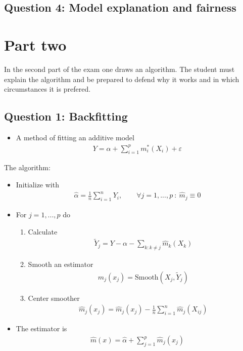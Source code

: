 \documentclass[a4paper,12pt,openany]{book}
\providecommand{\tightlist}{%
 \setlength{\itemsep}{0pt}\setlength{\parskip}{0pt}}
\begin{document}
\hypertarget{question-4-model-explanation-and-fairness}{%
\subsection{Question 4: Model explanation and fairness}\label{question-4-model-explanation-and-fairness}}

\hypertarget{part-two}{%
\section{Part two}\label{part-two}}

In the second part of the exam one draws an algorithm. The student must explain the algorithm and be prepared to defend why it works and in which circumstances it is prefered.

\hypertarget{question-1-backfitting}{%
\subsection{Question 1: Backfitting}\label{question-1-backfitting}}

\begin{itemize}
\tightlist
\item
  A method of fitting an additive model
  \begin{align*}
    Y=\alpha +\sum_{i=1}^pm^*_i(X_i)+\varepsilon
    \end{align*}
\end{itemize}

The algorithm:

\begin{itemize}
\tightlist
\item
  Initialize with
  \begin{align*}
    \hat \alpha = \frac{1}{n}\sum_{i=1}^n Y_i,\qquad\forall j=1,...,p\ :\ \hat m_j\equiv 0
    \end{align*}
\item
  For \(j=1,...,p\) do

  \begin{enumerate}
  \def\labelenumi{(\alph{enumi})}
  \tightlist
  \item
    Calculate
    \begin{align*}
    \tilde Y_j=Y-\alpha-\sum_{k:k\ne j}\hat m_k(X_{k})
    \end{align*}
  \item
    Smooth an estimator
    \begin{align*}
    \hat m_j(x_j)=\text{Smooth}(X_j,\tilde Y_j)
    \end{align*}
  \item
    Center smoother
    \begin{align*}
    \hat m_j(x_j)=\hat m_j(x_j)-\frac{1}{n}\sum_{i=1}^n \hat m_j(X_{ij})
    \end{align*}
  \end{enumerate}
\item
  The estimator is
  \begin{align*}
    \hat m(x)=\hat\alpha + \sum_{j=1}^p\hat m_j(x_j)
    \end{align*}
\end{itemize}
\end{document}
